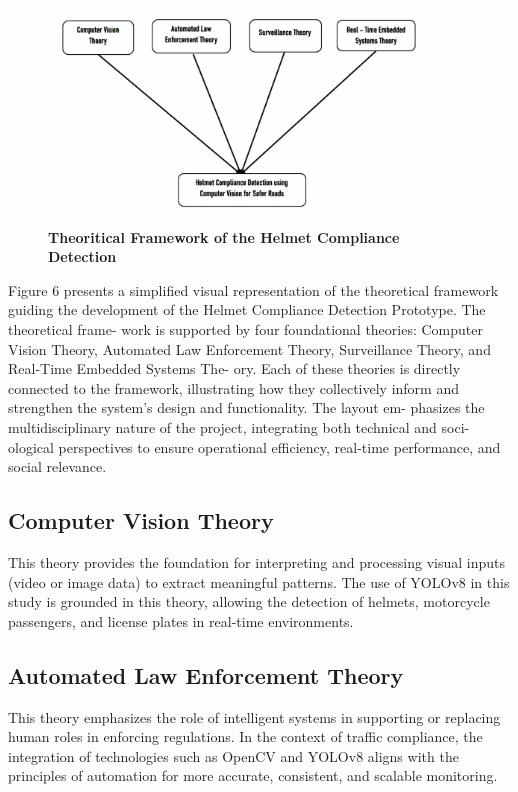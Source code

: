 \begin{refsection}
\begin{figure}[H]
    \centering
    \includegraphics[width=0.9\textwidth]{figures/Fig 6.jpg}
    \caption{\textbf{Theoritical Framework of the Helmet Compliance Detection }}
    \label{figures/Fig 6.jpg}
\end{figure}
Figure 6 presents a simplified visual representation of the theoretical framework guiding the development of the Helmet Compliance Detection Prototype. The theoretical frame- work is supported by four foundational theories: Computer Vision Theory, Automated Law Enforcement Theory, Surveillance Theory, and Real-Time Embedded Systems The- ory. Each of these theories is directly connected to the framework, illustrating how they collectively inform and strengthen the system’s design and functionality. The layout em- phasizes the multidisciplinary nature of the project, integrating both technical and soci- ological perspectives to ensure operational efficiency, real-time performance, and social relevance.

\subsection{Computer Vision Theory}
This theory provides the foundation for interpreting and processing visual inputs (video or image data) to extract meaningful patterns. The use of YOLOv8 in this study is grounded in this theory, allowing the detection of helmets, motorcycle passengers, and license plates in real-time environments.

\subsection{Automated Law Enforcement Theory}
This theory emphasizes the role of intelligent systems in supporting or replacing human roles in enforcing regulations. In the context of traffic compliance, the integration of technologies such as OpenCV and YOLOv8 aligns with the principles of automation for more accurate, consistent, and scalable monitoring.


\end{refsection}
